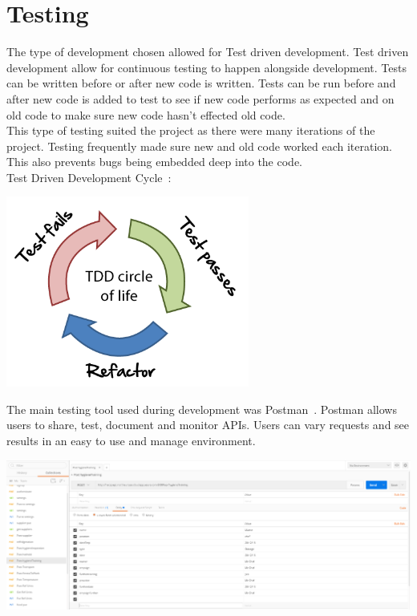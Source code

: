 \section{Testing}
The type of development chosen allowed for Test driven development. Test driven development allow for continuous testing to happen alongside development. Tests can be written before or after new code is written. Tests can be run before and after new code is added to test to see if new code performs as expected and on old code to make sure new code hasn't effected old code. \\

This type of testing suited the project as there were many iterations of the project. Testing frequently made sure new and old code worked each iteration. This also prevents bugs being embedded deep into the code. \\

Test Driven Development Cycle~\cite{TDDphoto}:
    \begin{center}    
      \includegraphics[width=80mm]{img/TDD.png}
    \end{center}

The main testing tool used during development was Postman~\cite{postman}. Postman allows users to share, test, document and monitor APIs. Users can vary requests and see results in an easy to use and manage environment.

\begin{center}    
    \includegraphics[width=140mm]{img/testing/postmanPost.png}
\end{center}


